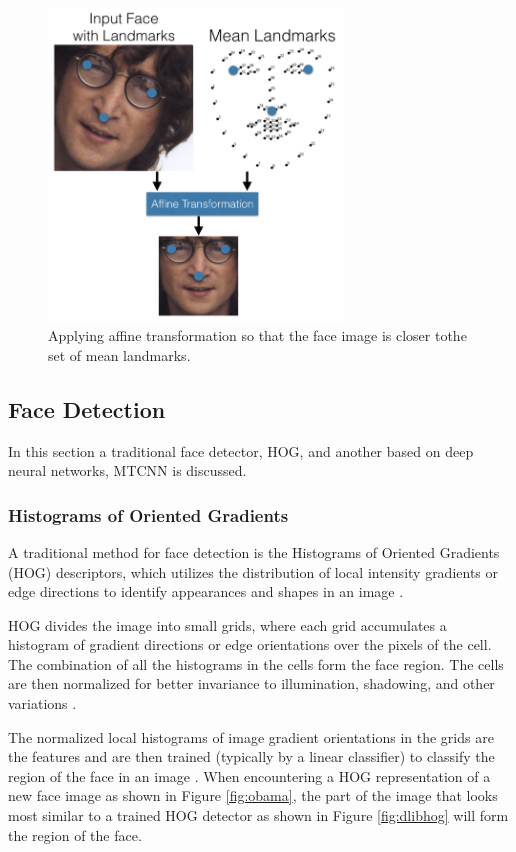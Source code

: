 \documentclass[12pt,english]{article}
\begin{document}
\begin{figure}[!tbp]
 \centering
    \includegraphics[width=0.7\textwidth]{figures/openface_detection.png}
    \caption{Applying affine transformation so that the face image is closer tothe set of mean landmarks. \cite{amos}}
	\label{fig:meanlandmark}
\end{figure}

\subsection{Face Detection}
\quad
In this section a traditional face detector, HOG, and another based on deep neural networks, MTCNN is discussed.

\subsubsection{Histograms of Oriented Gradients}
\quad
A traditional method for face detection is the Histograms of Oriented Gradients (HOG) descriptors, which utilizes the distribution of local intensity gradients or edge directions to identify appearances and shapes in an image \cite{dalal}. 

HOG divides the image into small grids, where each grid accumulates a histogram of gradient directions or edge orientations over the pixels of the cell. The combination of all the histograms in the cells form the face region. The cells are then normalized for better invariance to illumination, shadowing, and other variations \cite{dalal}. 

The normalized local histograms of image gradient orientations in the grids are the features and are then trained (typically by a linear classifier) to classify the region of the face in an image \cite{dalal}. When encountering a HOG representation of a new face image as shown in Figure \ref{fig:obama}, the part of the image that looks most similar to a trained HOG detector as shown in Figure \ref{fig:dlibhog} will form the region of the face. 
\end{document}
